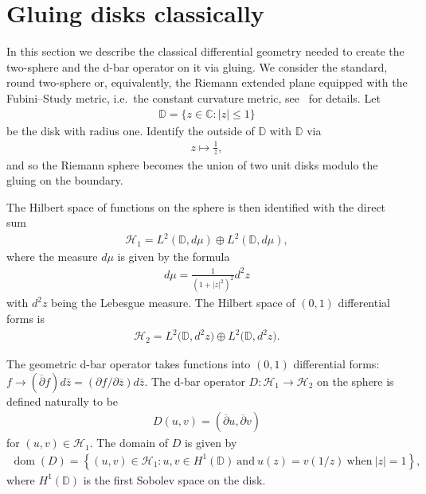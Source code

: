 \documentclass[pdftex]{sigma}
\numberwithin{equation}{section}
\DeclareMathOperator{\dom}{dom}
\begin{document}
\section{Gluing disks classically}\label{Section2}

In this section we describe the classical dif\/ferential geometry needed to create the two-sphere and the d-bar operator
on it via gluing.
We consider the standard, round two-sphere or, equivalently, the Riemann extended plane equipped with the Fubini--Study
metric, i.e.~the constant curvature metric, see~\cite{Ahlfors} for details.
Let
\begin{gather*}
{\mathbb D} = \{z\in{\mathbb C}: |z|\le 1\}
\end{gather*}
be the disk with radius one.
Identify the outside of ${\mathbb D}$ with ${\mathbb D}$ via
\begin{gather*}
z\mapsto\frac{1}{z},
\end{gather*}
and so the Riemann sphere becomes the union of two unit disks modulo the gluing on the boundary.

The Hilbert space of functions on the sphere is then identif\/ied with the direct sum
\begin{gather*}
\mathcal{H}_1 = L^2({\mathbb D}, d\mu) \oplus L^2({\mathbb D}, d\mu),
\end{gather*}
where the measure $d\mu$ is given by the formula
\begin{gather*}
d\mu = \frac{1}{(1+|z|^2)^2}d^2z
\end{gather*}
with $d^2z$ being the Lebesgue measure.
The Hilbert space of $(0,1)$ dif\/ferential forms is
\begin{gather*}
\mathcal{H}_2 = L^2\big({\mathbb D}, d^2z\big) \oplus L^2\big({\mathbb D}, d^2z\big).
\end{gather*}

The geometric d-bar operator takes functions into $(0,1)$ dif\/ferential forms: $f\to (\overline{\partial}f)d\bar z=
(\partial f/\partial\overline{z})d\bar z$.
The d-bar operator $D: \mathcal{H}_1\to\mathcal{H}_2$ on the sphere is def\/ined naturally to be
\begin{gather}
\label{dirac_op}
D(u,v) = (\overline{\partial}u, \overline{\partial}v)
\end{gather}
for $(u,v)\in\mathcal{H}_1$.
The domain of $D$ is given by
\begin{gather}
\label{dom_D}
\dom(D) = \left\{(u,v)\in\mathcal{H}_1: u,v\in H^1({\mathbb D})~\text{and}~u(z)=v(1/z)~\textrm{when}~|z|=1\right\},
\end{gather}
where $H^1({\mathbb D})$ is the f\/irst Sobolev space on the disk.
\end{document}
